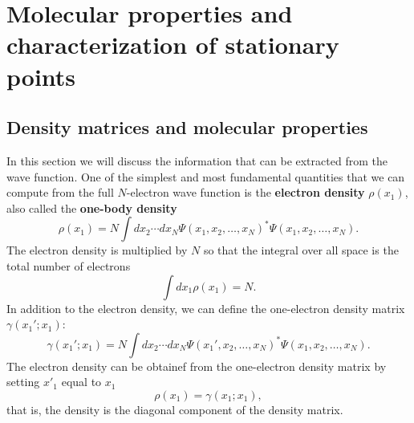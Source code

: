 \documentclass[../Main/chem532-notes.tex]{subfiles}
\begin{document}
\setcounter{chapter}{5}

\chapter{Molecular properties and characterization of stationary points}

\section{Density matrices and molecular properties}
In this section we will discuss the information that can be extracted from the wave function.
One of the simplest and most fundamental quantities that we can compute from the full $N$-electron wave function is the \textbf{electron density} $\rho(x_1)$, also called the \textbf{one-body density}
\begin{equation}
\rho(x_1) = N \int dx_2 \cdots dx_N \Psi(x_1,x_2,\ldots,x_N)^* \Psi(x_1,x_2,\ldots,x_N).
\end{equation}
The electron density is multiplied by $N$ so that the integral over all space is the total number of electrons
\begin{equation}
\int dx_1 \rho(x_1) = N.
\end{equation}
In addition to the electron density, we can define the one-electron density matrix $\gamma(x_1';x_1)$:
\begin{equation}
\gamma(x_1';x_1) = N \int dx_2 \cdots dx_N \Psi(x_1',x_2,\ldots,x_N)^* \Psi(x_1,x_2,\ldots,x_N).
\end{equation}
The electron density can be obtainef from the one-electron density matrix by setting $x'_1$ equal to $x_1$
\begin{equation}
\rho(x_1) = \gamma(x_1;x_1),
\end{equation}
that is, the density is the diagonal component of the density matrix.
\end{document}
